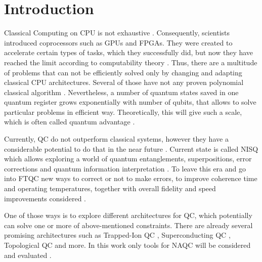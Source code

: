 
\chapter{Introduction}\label{chapter:introduction}
Classical Computing on CPU is not exhaustive \parencite{article}. Consequently, scientists introduced coprocessors such as GPUs and FPGAs.
They were created to accelerate certain types of tasks, which they successfully did, 
but now they have reached the limit according to computability theory \parencite{article}.
Thus, there are a multitude of problems that can not be efficiently solved only by changing and adapting classical CPU architectures.
Several of those have not any proven polynomial classical algorithm \parencite{article, Markov_2014}.
Nevertheless, a number of quantum states saved in one quantum register grows exponentially with number of qubits, 
that allows to solve particular problems in efficient way.
Theoretically, this will give such a scale, which is often called quantum advantage \parencite{Markov_2014}.

Currently, \ac{QC} do not outperform classical systems, however they have a considerable potential to do that in the near future \parencite{article, Markov_2014}. 
Current state is called \ac{NISQ} which allows exploring a world of quantum entanglements, 
superpositions, error corrections and quantum information interpretation \parencite{Preskill_2018}.
To leave this era and go into \ac{FTQC} new ways to correct or not to make errors, 
to improve coherence time and operating temperatures, together with overall fidelity and speed improvements considered \parencite{quera2023faulttolerant}.

One of those ways is to explore different architectures for \ac{QC}, which potentially can solve one or more of above-mentioned constraints.
There are already several promising architectures such as Trapped-Ion \ac{QC} \parencite{Bruzewicz_2019}, Superconducting \ac{QC} \parencite{Huang_2020}, Topological \ac{QC} \parencite{Lahtinen_2017} and more.
In this work only tools for \ac{NAQC} will be considered and evaluated \parencite{Wintersperger_2023, Schmid_2024_NeutralAtomBasics, Philipp_Wondra_TUM_Thesis_for_Informatics.pdf}. 

